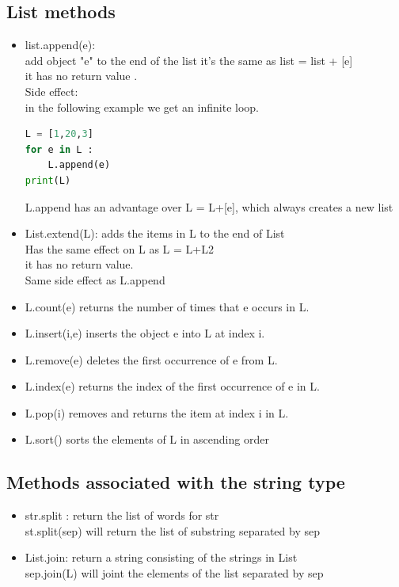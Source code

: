 \documentclass[12pt,oneside]{book}
\begin{document}
\subsection{List methods}
\begin{itemize}
	\item list.append(e):\\
		add object "e" to the end of the list it's the same as list = list + [e]\\
		it has no return value .\\
		Side effect:\\
		in the following example we get an infinite loop.
\begin{lstlisting}[language=python]
L = [1,20,3]
for e in L :
	L.append(e)
print(L)
\end{lstlisting}
	      L.append has an advantage over L = L+[e], which always creates a new list
	\item List.extend(L): adds the items in L to the end of List  \\
	      Has the same effect on L as L = L+L2 \\
	      it has no return value. \\
	      Same side effect as L.append
	\item L.count(e) returns the number of times that e occurs in L.
	\item L.insert(i,e) inserts the object e into L at index i.
	\item L.remove(e) deletes the first occurrence of e from L.
	\item L.index(e) returns the index of the first occurrence of e in L.
	\item L.pop(i) removes and returns the item at index i in L.
	\item L.sort() sorts the elements of L in ascending order
\end{itemize}
\subsection{Methods associated with the string type}
\begin{itemize}
	\item str.split : return the list of words for str \\
	      st.split(sep) will return the list of substring separated by sep
	\item List.join: return a string consisting of the strings in List \\
	      sep.join(L) will joint the elements of the list separated by sep
\end{itemize}
\end{document}
